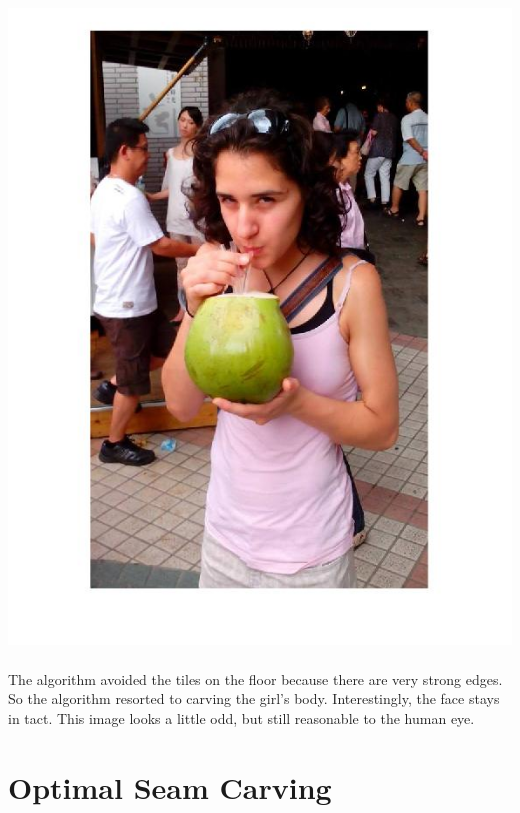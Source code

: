 \documentclass[english]{article}
\begin{document}
\includegraphics[scale=0.6]{carving/lola100removed.jpg}\\\\
The algorithm avoided the tiles on the floor because there are very strong edges. So the algorithm resorted to carving the girl's body. Interestingly, the face stays in tact. This image looks a little odd, but still reasonable to the human eye.

\section*{Optimal Seam Carving}
\end{document}
